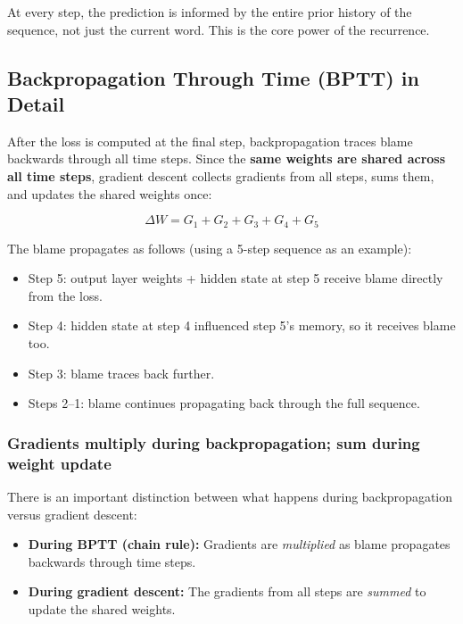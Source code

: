 At every step, the prediction is informed by the entire prior history of the sequence,
not just the current word. This is the core power of the recurrence.

\subsection{Backpropagation Through Time (BPTT) in Detail}

After the loss is computed at the final step, backpropagation traces blame backwards
through all time steps. Since the \textbf{same weights are shared across all time steps},
gradient descent collects gradients from all steps, sums them, and updates the shared
weights once:

\[
\Delta W = G_1 + G_2 + G_3 + G_4 + G_5
\]

The blame propagates as follows (using a 5-step sequence as an example):
\begin{itemize}
    \item Step 5: output layer weights + hidden state at step 5 receive blame directly
          from the loss.
    \item Step 4: hidden state at step 4 influenced step 5's memory, so it receives blame
          too.
    \item Step 3: blame traces back further.
    \item Steps 2--1: blame continues propagating back through the full sequence.
\end{itemize}

\subsubsection{Gradients multiply during backpropagation; sum during weight update}

There is an important distinction between what happens during backpropagation versus
gradient descent:

\begin{itemize}
    \item \textbf{During BPTT (chain rule):} Gradients are \textit{multiplied} as blame
          propagates backwards through time steps.
    \item \textbf{During gradient descent:} The gradients from all steps are
          \textit{summed} to update the shared weights.
\end{itemize}

